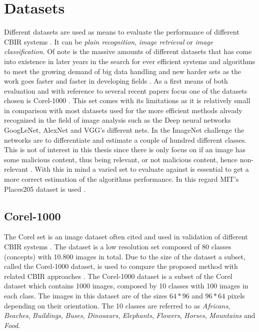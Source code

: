 \section{Datasets}
\label{sec:theory:datasets}
Different datasets are used as means to evaluate the performance of different CBIR systems . It  can be \emph{plain recognition}, \emph{image retrieval} or \emph{image classification}. Of note is the massive amounts of different datasets that has come into existence in later years in the search for ever efficient systems and algorithms to meet the growing demand of big data handling and new harder sets as the work goes faster and faster in developing fields  . As a first means of both evaluation and with reference to several recent papers \cite{liu2015content}\cite{wang2015new}  focus one of the datasets chosen  is Corel-1000 \cite{alzu2015semantic}. This set comes with its limitations as it is relatively small in comparison with most datasets used for the more  efficient methods already recognized in the field of image analysis such as the Deep neural networks  GoogLeNet, AlexNet and VGG's  different nets. In the ImageNet challenge  the networks are to differentiate and estimate a couple of hundred different classes. This is not of interest  in this thesis since there is only focus on if an image has some malicious content, thus being relevant, or not malicious content, hence non-relevant . With this in mind a varied set to evaluate against is essential to get a more correct estimation of the algorithms  performance. In this regard MIT's Places205 dataset is used .

\subsection{Corel-1000}
\label{sec:corel}
The Corel set is an image dataset often cited and used in validation of different CBIR systems \cite{coreldataset2017}. The dataset is a low resolution set composed of 80 classes (concepts) with 10.800 images in total. Due to the size of the dataset a subset, called the Corel-1000 dataset, is used to compare the proposed method with related CBIR approaches \cite{wang2001simplicity}. The Corel-1000 dataset is a subset of the Corel dataset which contains 1000 images, composed by 10 classes with 100 images in each class. The images in this dataset are of the sizes $64*96$ and $96*64$ pixels depending on their orientation. The 10 classes are referred to as \emph{Africans}, \emph{Beaches}, \emph{Buildings}, \emph{Buses}, \emph{Dinosaurs}, \emph{Elephants}, \emph{Flowers}, \emph{Horses}, \emph{Mountains} and \emph{Food}. 

